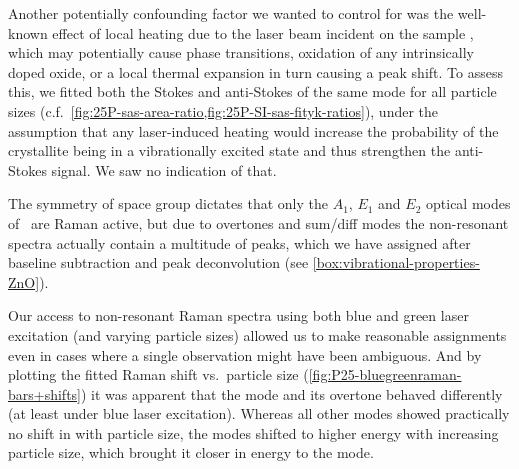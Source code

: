 \documentclass[draft,webedition,openright,titles,swedish,english]{LuaUUThesis}\usepackage[]{graphicx}\usepackage[]{xcolor}
\newcommand{\cf}{c.f.}
\newcommand{\vs}{vs.}
\begin{document}
Another potentially confounding factor we wanted to control for was the well-known
effect of local heating due to the laser beam incident on the sample \cite{Thyr2023},
which may potentially cause phase transitions, oxidation of any intrinsically doped oxide,
or a local thermal expansion in turn causing a peak shift.
To assess this, we fitted both the Stokes and anti-Stokes of the same mode for
all particle sizes (\cf\ \cref{fig:25P-sas-area-ratio,fig:25P-SI-sas-fityk-ratios}),
under the assumption that any laser-induced heating would increase the probability
of the crystallite being in a vibrationally excited state and thus strengthen the
anti-Stokes signal. We saw no indication of that.

The symmetry of space group  dictates that only the
$A_1$, $E_1$ and $E_2$ optical modes of \ZnO\ are Raman active, but
due to overtones and sum/diff modes the non-resonant spectra
actually contain a multitude of peaks, which we have assigned after baseline
subtraction and peak deconvolution
(see \cref{box:vibrational-properties-ZnO}).

Our access to non-resonant Raman spectra using both blue and green laser excitation
(and varying particle sizes)
allowed us to make reasonable assignments even in cases where a single observation
might have been ambiguous.
And by plotting the fitted Raman shift \vs\ particle size (\cref{fig:P25-bluegreenraman-bars+shifts})
it was apparent that the  mode and its overtone behaved differently
(at least under blue laser excitation).
Whereas all other modes showed practically no shift in  with
particle size, the  modes shifted to higher energy with increasing
particle size, which brought it closer in energy to the  mode.


\clearpage
%
\end{document}
